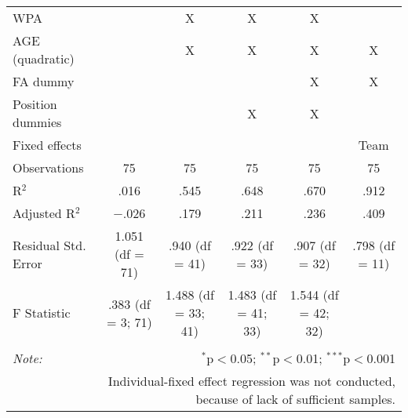 \begin{table}[H]
\begin{tabular}{@{\extracolsep{5pt}}lccccc}
WPA &  & X & X & X &  \\
AGE (quadratic) &  & X & X & X & X \\
FA dummy &  &  &  & X & X \\
Position dummies &  &  & X & X &  \\
Fixed effects &  &  &  &  & Team \\
Observations & 75 & 75 & 75 & 75 & 75 \\
R$^{2}$ & .016 & .545 & .648 & .670 & .912 \\
Adjusted R$^{2}$ & $-$.026 & .179 & .211 & .236 & .409 \\
Residual Std. Error & 1.051 (df = 71) & .940 (df = 41) & .922 (df = 33) & .907 (df = 32) & .798 (df = 11) \\
F Statistic & .383 (df = 3; 71) & 1.488 (df = 33; 41) & 1.483 (df = 41; 33) & 1.544 (df = 42; 32) &  \\
\hline
\hline \\[-1.8ex]
\textit{Note:}  & \multicolumn{5}{r}{$^{*}$p$<$0.05; $^{**}$p$<$0.01; $^{***}$p$<$0.001} \\
& \multicolumn{5}{r}{Individual-fixed effect regression was not conducted, because of lack of sufficient samples.} \\ 
\end{tabular}
\end{table}
